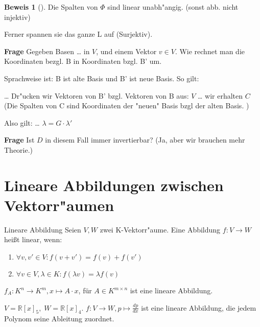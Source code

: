 \documentclass[oneside,fontsize=11pt,paper=a4,BCOR=0mm,DIV=12,automark,headsepline]{scrbook}
\theoremstyle{remark}
\theoremstyle{definition}
\theoremstyle{definition}
\newtheorem*{prof}{Beweis}
\theoremstyle{remark}
\begin{document}
\begin{prof}[]
  Die Spalten von \(\Phi\) sind linear unabh"angig. (sonst abb. nicht injektiv)

  Ferner spannen sie das ganze L auf (Surjektiv). 
\end{prof}

\textbf{Frage} Gegeben Basen \ldots{} in \(V\), und einem Vektor \(v\in V\). Wie rechnet man die
Koordinaten bezgl. B in Koordinaten bzgl. B' um.

Sprachweise ist: B ist alte Basis und B' ist neue Basis.
So gilt:
\begin{relation}
  \ldots{} Dr"ucken wir Vektoren von B' bzgl. Vektoren von B aus: \(V\) \ldots{}
  wir erhalten \(C\) 
  (Die Spalten von C sind Koordinaten der "neuen" Basis bzgl der alten Basis. )

  Also gilt: \ldots{}
  \(\lambda = G\cdot \lambda'\)
\end{relation}

\textbf{Frage} Ist \(D\) in diesem Fall immer invertierbar? (Ja, aber wir brauchen mehr Theorie.)

\chapter{Lineare Abbildungen zwischen Vektorr"aumen}
\label{sec:orgb4c03c4}
\begin{definition}{Lineare Abbildung}{}
  Seien \(V, W\) zwei K-Vektorr"aume. Eine Abbildung \(f: V\rightarrow W\) heißt linear, wenn:

  \begin{enumerate}
  \item \(\forall v,v' \in V: f(v+v')=f(v)+f(v')\)
  \item \(\forall v\in V, \lambda \in K: f(\lambda v)=\lambda f(v)\)
  \end{enumerate}

\end{definition}

\begin{exa}
  $f_{A}: K^n\rightarrow K^m, x\mapsto A\cdot x$, für $A \in K^{m\times n}$ ist eine lineare Abbildung.
\end{exa}

\begin{exa}
  \(V=\mathbb{R}[x]_5,\;W=\mathbb{R}[x]_4\). $f: V\rightarrow W, p \mapsto \frac{dp}{dx}$ ist eine lineare Abbildung, die jedem Polynom seine Ableitung zuordnet.
\end{exa}
\end{document}
